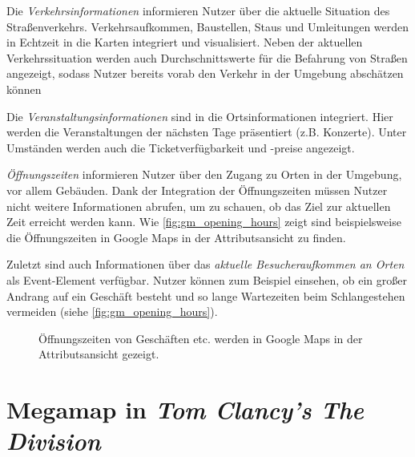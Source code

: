 Die \emph{Verkehrsinformationen} informieren Nutzer über die aktuelle Situation des Straßenverkehrs.
Verkehrsaufkommen, Baustellen, Staus und Umleitungen werden in Echtzeit in die Karten integriert und visualisiert.
Neben der aktuellen Verkehrssituation werden auch Durchschnittswerte für die Befahrung von Straßen angezeigt, sodass Nutzer bereits vorab den Verkehr in der Umgebung abschätzen können

Die \emph{Veranstaltungsinformationen} sind in die Ortsinformationen integriert.
Hier werden die Veranstaltungen der nächsten Tage präsentiert (z.B. Konzerte).
Unter Umständen werden auch die Ticketverfügbarkeit und -preise angezeigt.

\emph{Öffnungszeiten} informieren Nutzer über den Zugang zu Orten in der Umgebung, vor allem Gebäuden.
Dank der Integration der Öffnungszeiten müssen Nutzer nicht weitere Informationen abrufen, um zu schauen, ob das Ziel zur aktuellen Zeit erreicht werden kann.
Wie \autoref{fig:gm_opening_hours} zeigt sind beispielsweise die Öffnungszeiten in Google Maps in der Attributsansicht zu finden.

Zuletzt sind auch Informationen über das \emph{aktuelle Besucheraufkommen an Orten} als Event-Element verfügbar.
Nutzer können zum Beispiel einsehen, ob ein großer Andrang auf ein Geschäft besteht und so lange Wartezeiten beim Schlangestehen vermeiden (siehe \autoref{fig:gm_opening_hours}).
\begin{figure}[bht]
	\centering
	\caption{Öffnungszeiten von Geschäften etc. werden in Google Maps in der Attributsansicht gezeigt.}
	\label{fig:gm_opening_hours}
\end{figure}

\section{Megamap in \emph{Tom Clancy's The Division}}


